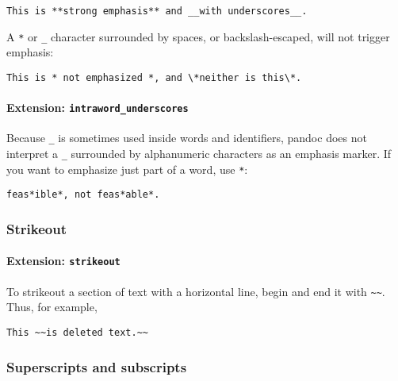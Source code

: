 \documentclass[]{article}
\let\oldparagraph\paragraph
\renewcommand{\paragraph}[1]{\oldparagraph{#1}\mbox{}}
\begin{document}
\begin{verbatim}
This is **strong emphasis** and __with underscores__.
\end{verbatim}

A \texttt{*} or \texttt{\_} character surrounded by spaces, or
backslash-escaped, will not trigger emphasis:

\begin{verbatim}
This is * not emphasized *, and \*neither is this\*.
\end{verbatim}

\paragraph{\texorpdfstring{Extension:
\texttt{intraword\_underscores}}{Extension: intraword\_underscores}}\label{extension-intraword_underscores}

Because \texttt{\_} is sometimes used inside words and identifiers,
pandoc does not interpret a \texttt{\_} surrounded by alphanumeric
characters as an emphasis marker. If you want to emphasize just part of
a word, use \texttt{*}:

\begin{verbatim}
feas*ible*, not feas*able*.
\end{verbatim}

\hypertarget{strikeout}{\subsubsection{Strikeout}\label{strikeout}}

\paragraph{\texorpdfstring{Extension:
\texttt{strikeout}}{Extension: strikeout}}\label{extension-strikeout}

To strikeout a section of text with a horizontal line, begin and end it
with \texttt{\textasciitilde{}\textasciitilde{}}. Thus, for example,

\begin{verbatim}
This ~~is deleted text.~~
\end{verbatim}

\hypertarget{superscripts-and-subscripts}{\subsubsection{Superscripts
and subscripts}\label{superscripts-and-subscripts}}
\end{document}

